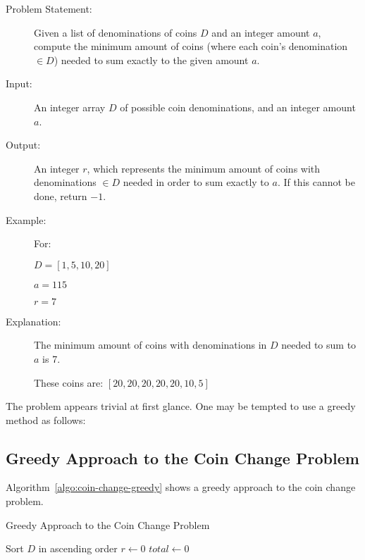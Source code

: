 \begin{description}
    \item[Problem Statement:]
        Given a list of denominations of coins $D$ and an integer amount $a$, compute the minimum amount of coins (where each coin's denomination $\in D$) needed to sum exactly to the given amount $a$.
        
    \item[Input:] 
        An integer array $D$ of possible coin denominations, and an integer amount $a$.
        
    \item[Output:] 
        An integer $r$, which represents the minimum amount of coins with denominations $\in D$ needed in order to sum exactly to $a$. If this cannot be done, return $-1$.
        
    \item[Example:]
        For: 

        $D = [1, 5, 10, 20]$

        $a = 115$

        $r = 7$

    \item[Explanation:]
        The minimum amount of coins with denominations in $D$ needed to sum to $a$ is 7.

        These coins are: $[20,20,20,20,20,10,5]$


\end{description}

The problem appears trivial at first glance. One may be tempted to use a greedy method as follows:

\subsection{Greedy Approach to the Coin Change Problem}

Algorithm~\ref{algo:coin-change-greedy} shows a greedy approach to the coin change problem.

\begin{algorithm}[H]
    \caption{Greedy Approach to the Coin Change Problem}
    \label{algo:coin-change-greedy}
    Sort $D$ in ascending order\;
    $r \leftarrow 0$\;
    $total \leftarrow 0$\;
\end{algorithm}

